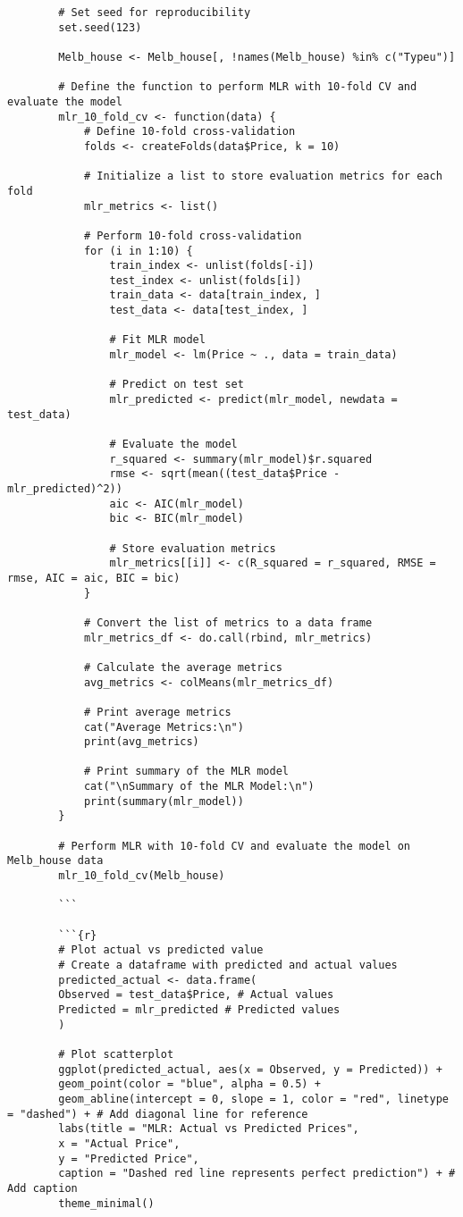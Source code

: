 \documentclass[12pt,doublespace]{article}
\begin{document}
\begin{lstlisting}
		# Set seed for reproducibility
		set.seed(123)
		
		Melb_house <- Melb_house[, !names(Melb_house) %in% c("Typeu")]
		
		# Define the function to perform MLR with 10-fold CV and evaluate the model
		mlr_10_fold_cv <- function(data) {
			# Define 10-fold cross-validation
			folds <- createFolds(data$Price, k = 10)
			
			# Initialize a list to store evaluation metrics for each fold
			mlr_metrics <- list()
			
			# Perform 10-fold cross-validation
			for (i in 1:10) {
				train_index <- unlist(folds[-i])
				test_index <- unlist(folds[i])
				train_data <- data[train_index, ]
				test_data <- data[test_index, ]
				
				# Fit MLR model
				mlr_model <- lm(Price ~ ., data = train_data)
				
				# Predict on test set
				mlr_predicted <- predict(mlr_model, newdata = test_data)
				
				# Evaluate the model
				r_squared <- summary(mlr_model)$r.squared
				rmse <- sqrt(mean((test_data$Price - mlr_predicted)^2))
				aic <- AIC(mlr_model)
				bic <- BIC(mlr_model)
				
				# Store evaluation metrics
				mlr_metrics[[i]] <- c(R_squared = r_squared, RMSE = rmse, AIC = aic, BIC = bic)
			}
			
			# Convert the list of metrics to a data frame
			mlr_metrics_df <- do.call(rbind, mlr_metrics)
			
			# Calculate the average metrics
			avg_metrics <- colMeans(mlr_metrics_df)
			
			# Print average metrics
			cat("Average Metrics:\n")
			print(avg_metrics)
			
			# Print summary of the MLR model
			cat("\nSummary of the MLR Model:\n")
			print(summary(mlr_model))
		}
		
		# Perform MLR with 10-fold CV and evaluate the model on Melb_house data
		mlr_10_fold_cv(Melb_house)
		
		```
		
		```{r}
		# Plot actual vs predicted value
		# Create a dataframe with predicted and actual values
		predicted_actual <- data.frame(
		Observed = test_data$Price, # Actual values
		Predicted = mlr_predicted # Predicted values
		)
		
		# Plot scatterplot
		ggplot(predicted_actual, aes(x = Observed, y = Predicted)) +
		geom_point(color = "blue", alpha = 0.5) +
		geom_abline(intercept = 0, slope = 1, color = "red", linetype = "dashed") + # Add diagonal line for reference
		labs(title = "MLR: Actual vs Predicted Prices",
		x = "Actual Price",
		y = "Predicted Price",
		caption = "Dashed red line represents perfect prediction") + # Add caption
		theme_minimal()
		

\end{lstlisting}
\end{document}
